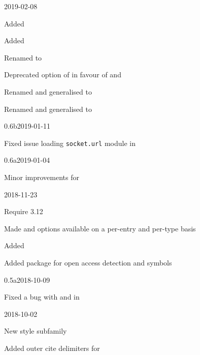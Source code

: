 \documentclass[DIV=9]{scrartcl}
\begin{document}
\begin{changelog}
\begin{release}{0.7}{2019-02-08}
  \item Added 
  \item Added 
  \item Renamed   to
  \item Deprecated option  of  in
    favour of  and 
  \item Renamed and generalised  to
  \item Renamed and generalised  to
\end{release}
\begin{release}{0.6b}{2019-01-11}
  \item Fixed issue loading \texttt{socket.url} module in
\end{release}
\begin{release}{0.6a}{2019-01-04}
  \item Minor improvements for 
\end{release}
\begin{release}{0.6}{2018-11-23}
  \item Require  3.12
  \item Made  and  options available on a
    per-entry and per-type basis
  \item Added 
  \item Added  package for open access detection and
    symbols
\end{release}
\begin{release}{0.5a}{2018-10-09}
  \item Fixed a bug with  and  in
\end{release}
\begin{release}{0.5}{2018-10-02}
  \item New  style
    subfamily
  \item Added outer cite delimiters for 

\end{release}
\end{changelog}
\end{document}
